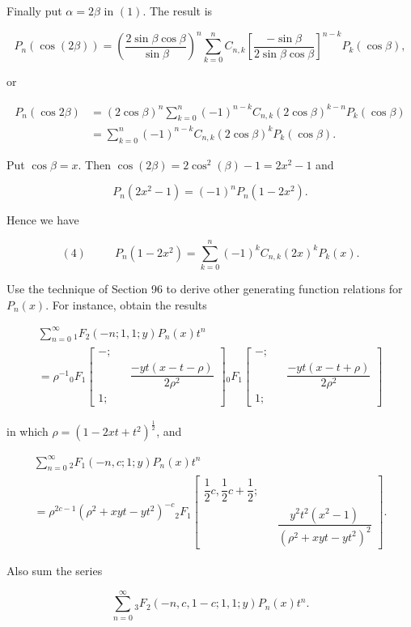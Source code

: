 \begin{solution}
Finally put $\alpha = 2 \beta$ in $(1)$. The result is

$$P_n(\cos(2\beta)) = \left( \dfrac{2 \sin \beta \cos \beta}{\sin \beta} \right)^n \displaystyle\sum_{k=0}^n C_{n,k} \left[ \dfrac{- \sin \beta}{2 \sin \beta \cos \beta} \right]^{n-k} P_k(\cos \beta),$$

or

$$\begin{array}{ll}
P_n(\cos 2 \beta) &= (2 \cos \beta)^n \displaystyle\sum_{k=0}^n (-1)^{n-k} C_{n,k} (2 \cos \beta)^{k-n} P_k(\cos \beta) \\
&= \displaystyle\sum_{k=0}^n (-1)^{n-k} C_{n,k} (2 \cos \beta)^k P_k( \cos \beta).
\end{array}$$

Put $\cos \beta = x$. Then $\cos(2 \beta) = 2 \cos^2(\beta) - 1 = 2x^2-1$ and 

$$P_n(2x^2-1) = (-1)^n P_n(1-2x^2).$$

Hence we have

$$(4) \hspace{30pt} P_n(1-2x^2) = \displaystyle\sum_{k=0}^n (-1)^k C_{n,k} (2x)^k P_k(x).$$
\end{solution}
\begin{problem}\label{problem8chapter10}
Use the technique of Section 96 to derive other generating function relations for $P_n(x)$. For instance, obtain the results

$$\begin{array}{ll}
\displaystyle\sum_{n=0}^{\infty} {}_1F_2(-n;1,1;y)P_n(x)t^n \\
= \rho^{-1}{}_0F_1 \left[ \begin{array}{rlr}
-; & & \\
& & \dfrac{-yt(x-t-\rho)}{2\rho^2} \\
1; & &
\end{array} \right] {}_0F_1 \left[ \begin{array}{rlr}
-; & & \\
& & \dfrac{-yt(x-t+\rho)}{2\rho^2} \\
1; & & 
\end{array} \right]
\end{array}$$

in which $\rho = (1-2xt+t^2)^{\frac{1}{2}}$, and

$$\begin{array}{ll}
\displaystyle\sum_{n=0}^{\infty} {}_2F_1(-n,c;1;y) P_n(x)t^n \\
= \rho^{2c-1}(\rho^2+xyt-yt^2)^{-c} {}_2F_1 \left[ \begin{array}{rlr}
\dfrac{1}{2}c, \dfrac{1}{2}c+\dfrac{1}{2}; & & \\
& & \dfrac{y^2 t^2(x^2-1)}{(\rho^2 + xyt - yt^2)^2}
\end{array} \right].
\end{array}$$

Also sum the series

$$\displaystyle\sum_{n=0}^{\infty} {}_3F_2(-n,c,1-c;1,1;y) P_n(x)t^n.$$
\end{problem}
